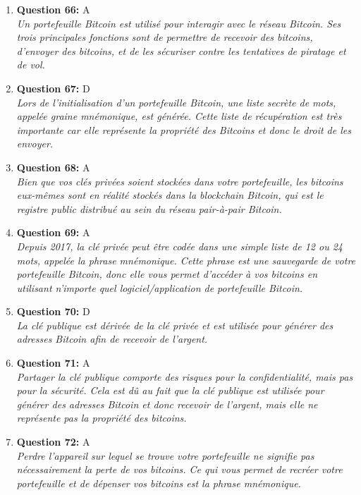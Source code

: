 \documentclass[12pt,a4paper]{article}
\begin{document}
\begin{enumerate}
\item \textbf{Question 66:} A
\\ \textit{Un portefeuille Bitcoin est utilisé pour interagir avec le réseau Bitcoin. Ses trois principales fonctions sont de permettre de recevoir des bitcoins, d'envoyer des bitcoins, et de les sécuriser contre les tentatives de piratage et de vol.}

\item \textbf{Question 67:} D
\\ \textit{Lors de l'initialisation d'un portefeuille Bitcoin, une liste secrète de mots, appelée graine mnémonique, est générée. Cette liste de récupération est très importante car elle représente la propriété des Bitcoins et donc le droit de les envoyer.}

\item \textbf{Question 68:} A
\\ \textit{Bien que vos clés privées soient stockées dans votre portefeuille, les bitcoins eux-mêmes sont en réalité stockés dans la blockchain Bitcoin, qui est le registre public distribué au sein du réseau pair-à-pair Bitcoin.}

\item \textbf{Question 69:} A
\\ \textit{Depuis 2017, la clé privée peut être codée dans une simple liste de 12 ou 24 mots, appelée la phrase mnémonique. Cette phrase est une sauvegarde de votre portefeuille Bitcoin, donc elle vous permet d'accéder à vos bitcoins en utilisant n'importe quel logiciel/application de portefeuille Bitcoin.}

\item \textbf{Question 70:} D
\\ \textit{La clé publique est dérivée de la clé privée et est utilisée pour générer des adresses Bitcoin afin de recevoir de l'argent.}

\item \textbf{Question 71:} A
\\ \textit{Partager la clé publique comporte des risques pour la confidentialité, mais pas pour la sécurité. Cela est dû au fait que la clé publique est utilisée pour générer des adresses Bitcoin et donc recevoir de l'argent, mais elle ne représente pas la propriété des bitcoins.}

\item \textbf{Question 72:} A
\\ \textit{Perdre l'appareil sur lequel se trouve votre portefeuille ne signifie pas nécessairement la perte de vos bitcoins. Ce qui vous permet de recréer votre portefeuille et de dépenser vos bitcoins est la phrase mnémonique.}


\end{enumerate}
\end{document}
